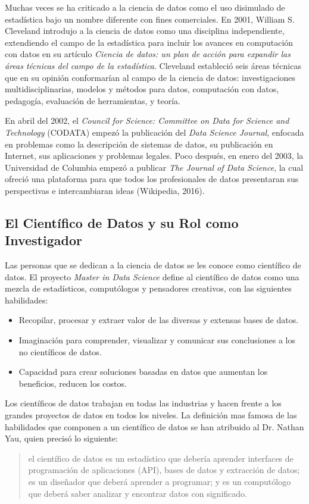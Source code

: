 \documentclass[letterpaper, spanish, 11pt]{report}
\begin{document}
Muchas veces se ha criticado a la ciencia de datos como el uso disimulado de estadística bajo un nombre diferente con fines comerciales. En 2001, William S. Cleveland introdujo a la ciencia de datos como una disciplina independiente, extendiendo el campo de la estadística para incluir los avances en computación con datos en su artículo \textit{Ciencia de datos: un plan de acción para expandir las áreas técnicas del campo de la estadística}. Cleveland estableció seis áreas técnicas que en su opinión conformarían al campo de la ciencia de datos: investigaciones multidisciplinarias, modelos y métodos para datos, computación con datos, pedagogía, evaluación de herramientas, y teoría.

En abril del 2002, el \textit{ Council for Science: Committee on Data for Science and Technology} (CODATA) empezó la publicación del \textit{Data Science Journal}, enfocada en problemas como la descripción de sistemas de datos, su publicación en Internet, sus aplicaciones y problemas legales. Poco después, en enero del 2003, la Universidad de Columbia empezó a publicar \textit{The Journal of Data Science}, la cual ofreció una plataforma para que todos los profesionales de datos presentaran sus perspectivas e intercambiaran ideas (Wikipedia, 2016).

\subsection{El Científico de Datos y su Rol como Investigador}
Las personas que se dedican a la ciencia de datos se les conoce como científico de datos. El proyecto \textit{Master in Data Science} define al científico de datos como una mezcla de estadísticos, computólogos y pensadores creativos, con las siguientes habilidades:

\begin{itemize}
	\item Recopilar, procesar y extraer valor de las diversas y extensas bases de datos.
	\item Imaginación para comprender, visualizar y comunicar sus conclusiones a los no científicos de datos.
	\item Capacidad para crear soluciones basadas en datos que aumentan los beneficios, reducen los costos.
\end{itemize}

Los científicos de datos trabajan en todas las industrias y hacen frente a los grandes proyectos de datos en todos los niveles. La definición mas famosa de las habilidades que componen a un científico de datos se han atribuido al Dr. Nathan Yau, quien precisó lo siguiente: \begin{quote} el científico de datos es un estadístico que debería aprender interfaces de programación de aplicaciones (API), bases de datos y extracción de datos; es un diseñador que deberá aprender a programar; y es un computólogo que deberá saber analizar y encontrar datos con significado. \end{quote}
\end{document}

